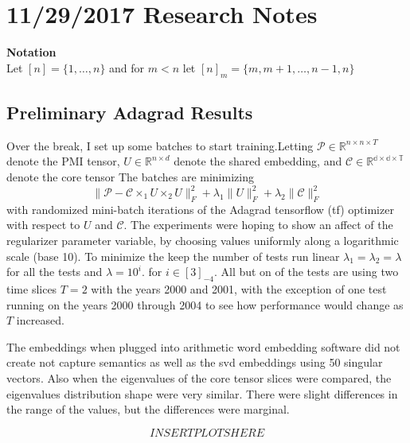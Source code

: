 \documentclass{report}
\begin{document}
	\section{11/29/2017 Research Notes}
	\textbf{Notation}\\
	Let $ [n] = \{1,\dots,n\} $ and for $  m < n $ let $ [n]_m = \{m,m+1, \dots,n-1, n\} $  
	
	\subsection{Preliminary Adagrad Results}
	
	   Over the break, I set up some batches to start training.Letting $ \mathcal{P} \in \mathbb{R}^{n \times n \times T} $ denote the PMI tensor, $ U \in \mathbb{R}^{n \times d}$ denote the shared embedding, and $ \mathcal{C} \in \mathbb{R^{d \times d \times T}} $ denote the core tensor The batches are minimizing 
	   \[ 
	      \|\mathcal{P} - \mathcal{C} \times_1 U \times_2 U \|_F^2 + \lambda_1 \|U\|_F^2 + \lambda_2 \|\mathcal{C}\|_F^2 
	   \]
	   with randomized mini-batch iterations of the Adagrad tensorflow (tf) optimizer with respect to $ U $ and $ \mathcal{C} $. The experiments were hoping to show an affect of the regularizer parameter variable, by choosing values uniformly along a logarithmic scale (base 10). To minimize the keep the number of tests run linear $ \lambda_1 = \lambda_2 =\lambda $ for all the tests and $ \lambda = 10^i $. for $ i \in [3]_{-4} $. All but on of the tests are using two time slices $ T = 2 $ with the years 2000 and 2001, with the exception of one test running on the years 2000 through 2004 to see how performance would change as $ T $ increased. 
	   
	   The embeddings when plugged into arithmetic word embedding software did not create not capture semantics as well as the svd embeddings using 50 singular vectors. Also when the eigenvalues of the core tensor slices were compared, the eigenvalues distribution shape were very similar. There were slight differences in the range of the values, but the differences were marginal.
	   
	   \[ 
	    INSERT PLOTS HERE
	   \]
	   
\end{document}
